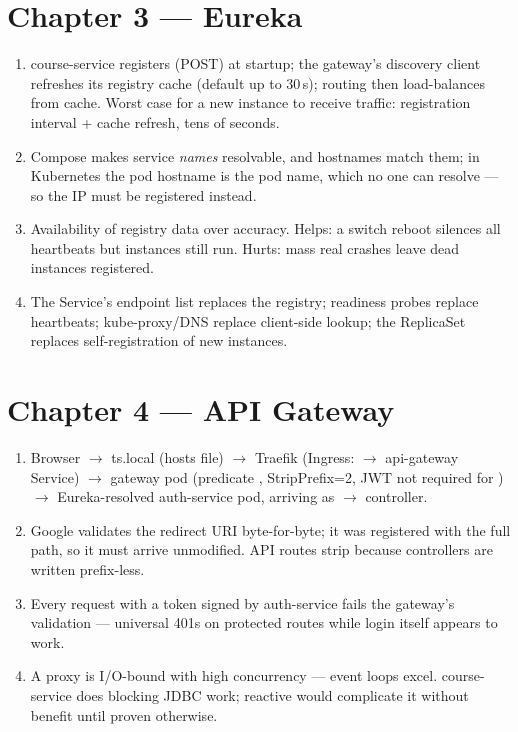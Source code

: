 \section*{Chapter 3 --- Eureka}
\begin{enumerate}
  \item course-service registers (POST) at startup; the gateway's
  discovery client refreshes its registry cache (default up to
  30\,s); routing then load-balances from cache. Worst case for a new
  instance to receive traffic: registration interval + cache refresh,
  tens of seconds.
  \item Compose makes service \emph{names} resolvable, and hostnames
  match them; in Kubernetes the pod hostname is the pod name, which
  no one can resolve --- so the IP must be registered instead.
  \item Availability of registry data over accuracy. Helps: a switch
  reboot silences all heartbeats but instances still run. Hurts: mass
  real crashes leave dead instances registered.
  \item The Service's endpoint list replaces the registry; readiness
  probes replace heartbeats; kube-proxy/DNS replace client-side
  lookup; the ReplicaSet replaces self-registration of new instances.
\end{enumerate}

\section*{Chapter 4 --- API Gateway}
\begin{enumerate}
  \item Browser $\rightarrow$ ts.local (hosts file) $\rightarrow$
  Traefik (Ingress:  $\rightarrow$ api-gateway Service)
  $\rightarrow$ gateway pod (predicate ,
  StripPrefix=2, JWT not required for ) $\rightarrow$
  Eureka-resolved auth-service pod, arriving as 
  $\rightarrow$ controller.
  \item Google validates the redirect URI byte-for-byte; it was
  registered with the full  path, so it must
  arrive unmodified. API routes strip because controllers are written
  prefix-less.
  \item Every request with a token signed by auth-service fails the
  gateway's validation --- universal 401s on protected routes while
  login itself appears to work.
  \item A proxy is I/O-bound with high concurrency --- event loops
  excel. course-service does blocking JDBC work; reactive would
  complicate it without benefit until proven otherwise.
\end{enumerate}

